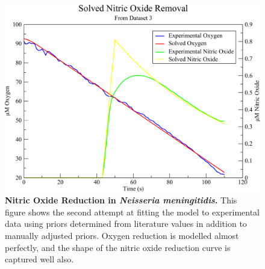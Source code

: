 \begin{figure}[tbp]
 \centering
 \includegraphics[width=15cm, clip=true]{./06-noreduction/data/aer-no-sim1-2.pdf}
 \caption[{Nitric Oxide Reduction in \textit{Neisseria meningitidis}.}]{{\bf Nitric Oxide Reduction in \textit{Neisseria meningitidis}.} This figure shows the second attempt at fitting the model to experimental data using priors determined from literature values in addition to manually adjusted priors. Oxygen reduction is modelled almost perfectly, and the shape of the nitric oxide reduction curve is captured well also.}
 \label{fig:nosim1.2}
\end{figure}


